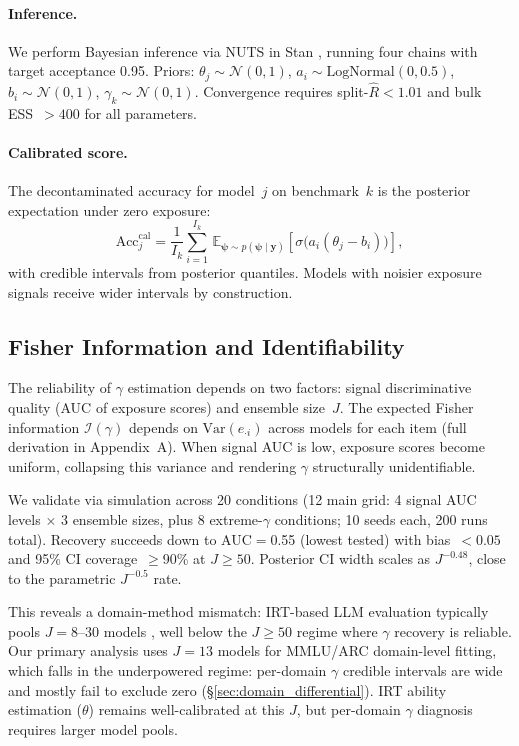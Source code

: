 \paragraph{Inference.}
We perform Bayesian inference via NUTS \citep{hoffman2014} in Stan \citep{carpenter2017}, running four chains with target acceptance 0.95. Priors: $\theta_j \sim \mathcal{N}(0,1)$, $a_i \sim \text{LogNormal}(0, 0.5)$, $b_i \sim \mathcal{N}(0,1)$, $\gamma_k \sim \mathcal{N}(0,1)$. Convergence requires split-$\hat{R} < 1.01$ and bulk ESS~$> 400$ for all parameters.

\paragraph{Calibrated score.}
The decontaminated accuracy for model~$j$ on benchmark~$k$ is the posterior expectation under zero exposure:
\begin{equation}
\label{eq:calibrated}
    \text{Acc}_{j}^{\text{cal}} = \frac{1}{I_k} \sum_{i=1}^{I_k}\, \mathbb{E}_{\boldsymbol{\psi} \sim p(\boldsymbol{\psi} \mid \mathbf{y})} \!\left[\sigma\!\bigl(a_i(\theta_j - b_i)\bigr)\right],
\end{equation}
with credible intervals from posterior quantiles. Models with noisier exposure signals receive wider intervals by construction.

\subsection{Fisher Information and Identifiability}
\label{sec:fisher}

The reliability of $\gamma$ estimation depends on two factors: signal discriminative quality (AUC of exposure scores) and ensemble size~$J$. The expected Fisher information $\mathcal{I}(\gamma)$ depends on $\text{Var}(e_{\cdot i})$ across models for each item (full derivation in Appendix~A). When signal AUC is low, exposure scores become uniform, collapsing this variance and rendering $\gamma$ structurally unidentifiable.

We validate via simulation across 20 conditions (12 main grid: 4 signal AUC levels $\times$ 3 ensemble sizes, plus 8 extreme-$\gamma$ conditions; 10 seeds each, 200 runs total). Recovery succeeds down to AUC$=$0.55 (lowest tested) with bias~$<0.05$ and 95\% CI coverage~$\geq$90\% at $J \geq 50$. Posterior CI width scales as $J^{-0.48}$, close to the parametric $J^{-0.5}$ rate.

This reveals a domain-method mismatch: IRT-based LLM evaluation typically pools $J = 8$--$30$ models \citep{habba_2025_growing_pains,lalor_2024_irt_nlp}, well below the $J \geq 50$ regime where $\gamma$ recovery is reliable. Our primary analysis uses $J = 13$ models for MMLU/ARC domain-level fitting, which falls in the underpowered regime: per-domain $\gamma$ credible intervals are wide and mostly fail to exclude zero (\S\ref{sec:domain_differential}). IRT ability estimation ($\theta$) remains well-calibrated at this $J$, but per-domain $\gamma$ diagnosis requires larger model pools.

